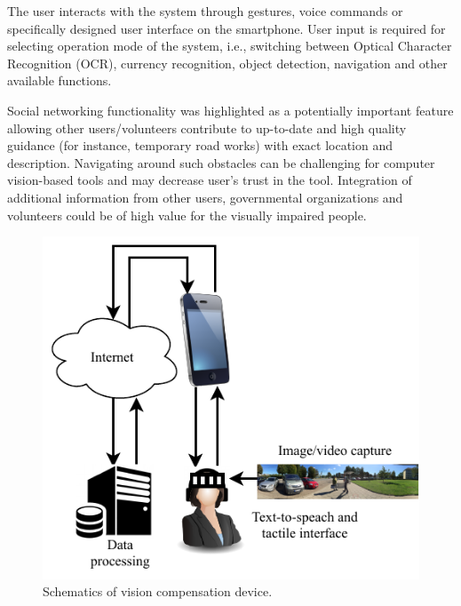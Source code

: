 \documentclass[10pt,conference,compsocconf]{IEEEtran}
\begin{document}
The user interacts with the system through gestures, voice commands or specifically designed user interface on the smartphone. User input is required for selecting operation mode of the system, i.e., switching between Optical Character Recognition (OCR), currency recognition, object detection, navigation and other available functions. 

Social networking functionality was highlighted as a potentially important feature allowing other users/volunteers contribute to up-to-date and high quality guidance (for instance, temporary road works) with exact location and description. Navigating around such obstacles can be challenging for computer vision-based tools and may decrease user's trust in the tool. Integration of additional information from other users, governmental organizations and volunteers could be of high value for the visually impaired people.

\begin{figure}
  \begin{center}
    \includegraphics[scale=1.0]{./img/cropped_diagram.pdf}  
  \end{center}
  \caption{Schematics of vision compensation device.}
  \label{fig:schematics}
\end{figure}
\end{document}
